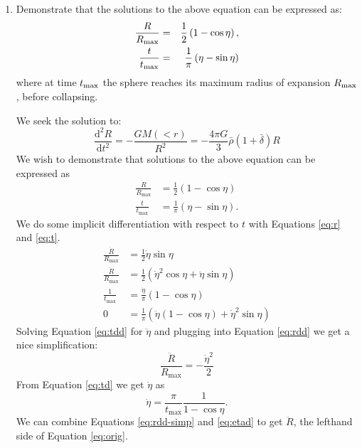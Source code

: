\begin{enumerate}
\begin{enumerate}
\item Demonstrate that the solutions to the above equation can be
expressed as:
\begin{eqnarray}
\label{eq:sphericalcollapse}
\frac{R}{R_{\rm max}} &=& \frac{1}{2}\left(1 - \cos\eta\right), \cr
\frac{t}{t_{\rm max}} &=& \frac{1}{\pi}\left(\eta - \sin\eta\right)
\end{eqnarray}
where at time $t_{\rm max}$ the sphere reaches its maximum radius of
expansion $R_{\rm max}$, before collapsing. 

\begin{answer}
We seek the solution to:
\begin{equation}\label{eq:orig}
  \frac{\mathrm d^2 R}{\mathrm dt^2}=-\frac{GM(<r)}{R^2}=-\frac{4\pi G}{3}\bar\rho(1+\bar\delta)R
\end{equation}
We wish to demonstrate that solutions to the above equation can be expressed as
\begin{align}
  \frac{R}{R_\text{max}}&=\frac{1}{2}(1-\cos\eta)\label{eq:r} \\
  \frac{t}{t_\text{max}}&=\frac{1}{\pi}(\eta-\sin\eta)\label{eq:t}.
\end{align}
We do some implicit differentiation with respect to $t$ with
Equations \ref{eq:r} and \ref{eq:t}.
\begin{align}
  \frac{\dot R}{R_\text{max}}&=\frac{1}{2}\dot\eta\sin\eta\label{eq:rd} \\
  \frac{\ddot R}{R_\text{max}}&=\frac{1}{2}(\dot\eta^2\cos\eta+\ddot\eta\sin\eta)\label{eq:rdd} \\
  \frac{1}{t_\text{max}}&=\frac{\dot\eta}{\pi}(1-\cos\eta)\label{eq:td} \\
  0&=\frac{1}{\pi}(\ddot\eta(1-\cos\eta)+\dot\eta^2\sin\eta)\label{eq:tdd}
\end{align}
Solving Equation \ref{eq:tdd} for $\ddot\eta$ and plugging into Equation \ref{eq:rdd} we get a nice simplification:
\begin{equation}
  \frac{\ddot R}{R_\text{max}}=-\frac{\dot\eta^2}{2}\label{eq:rdd-simp}
\end{equation}
From Equation \ref{eq:td} we get $\dot\eta$ as
\begin{equation}
  \dot\eta=\frac{\pi}{t_\text{max}}\frac{1}{1-\cos\eta}\label{eq:etad}.
\end{equation}
We can combine Equations \ref{eq:rdd-simp} and \ref{eq:etad} to get $\ddot R$, the lefthand side of Equation \ref{eq:orig}.
\begin{equation}

\end{equation}
\end{answer}
\end{enumerate}
\end{enumerate}

